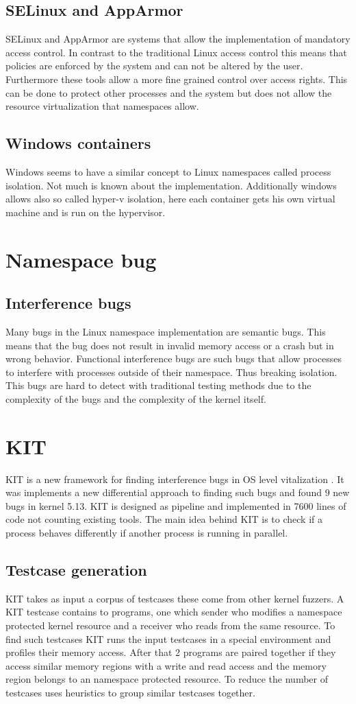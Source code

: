 \documentclass[10pt,twocolumn,a4paper]{article}
\begin{document}
\subsection{SELinux and AppArmor}
SELinux and AppArmor are systems that allow the implementation of mandatory access control. In
contrast to the traditional Linux access control this means that policies are enforced by the system
and can not be altered by the user. Furthermore these tools allow a more fine grained control over
access rights. This can be done to protect other processes and the system but does not allow the resource
virtualization that namespaces allow\cite{26}\cite{27}. 
\subsection{Windows containers}
Windows seems to have a similar concept to Linux namespaces called process isolation. Not much is known about the
implementation. Additionally windows allows also so called hyper-v isolation, here each container
gets his own virtual machine and is run on the hypervisor\cite{3}.
\section{Namespace bug}
\subsection{Interference bugs}
Many bugs in the Linux namespace implementation are semantic bugs. This means that the 
bug does not result in invalid memory access or a crash but in wrong behavior. Functional interference bugs are
such bugs that allow processes to interfere with processes outside of their namespace. Thus
breaking isolation. This bugs are hard to detect with traditional testing methods due to the
complexity of the bugs and the complexity of the kernel itself.
\section{KIT}
KIT is a new framework for finding interference bugs in OS level vitalization \cite{0}. It was
implements a new differential approach to finding such bugs and found 9 new bugs in kernel 5.13\cite{2}.
KIT is designed as pipeline and implemented in 7600 lines of code not counting existing tools\cite{0}.
The main idea behind KIT is to check if a process behaves differently if another process is running
in parallel.
\subsection{Testcase generation}
KIT takes as input a corpus of testcases these come from other kernel fuzzers.
A KIT testcase contains to programs, one which sender who modifies a namespace protected kernel
resource and a receiver who reads from the same resource. To find such testcases
KIT runs the input testcases in a special environment and profiles their memory access. 
After that 2 programs are paired together if they access similar memory regions with a write and
read access and the memory region belongs to an namespace protected resource.
To reduce the number of testcases uses heuristics to group similar testcases together.
\end{document}
